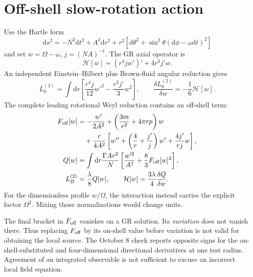 \documentclass[11pt,oneside]{report}
\newcommand{\dd}{\mathrm d}
\begin{document}
\section{Off-shell slow-rotation action}
Use the Hartle form
\begin{equation}
\dd s^2=-N^2\dd t^2+A^2\dd r^2+r^2[\dd\theta^2+\sin^2\theta(\dd\phi-\omega\dd t)^2]
\end{equation}
and set $w=\Omega-\omega$, $j=(NA)^{-1}$. The GR axial operator is
\begin{equation}
\mathcal H[w]=(r^4jw')'+4r^3j'w.
\end{equation}
An independent Einstein--Hilbert plus Brown-fluid angular reduction gives
\begin{equation}
L_0^{(2)}=\int\dd r\left[\frac{r^4j}{12}w'^2-\frac{r^3j'}3w^2\right],\qquad
\frac{\delta L_0^{(2)}}{\delta w}=-\frac16\mathcal H[w].
\end{equation}
The complete leading rotational Weyl reduction contains an off-shell term:
\begin{align}
F_{\rm off}[w]&=-\frac{w'}{2A^2}+
\left(\frac{3m}{r^2}+4\pi rp\right)w\\
&\quad+\frac r{4A^2}\left[w''+\left(\frac4r+\frac{j'}j\right)w'+\frac{4j'}{rj}w\right],\\
Q[w]&=\int\dd r\frac{\Gamma Ar^2}{N}
\left[\frac{w'^2}{A^2}+\frac83F_{\rm off}[w]^2\right],\\
L_B^{(2)}&=\frac\lambda8Q[w],\qquad
\mathcal H[w]=\frac{3\lambda}{4}\frac{\delta Q}{\delta w}.
\end{align}
For the dimensionless profile $w/\Omega$, the interaction instead carries the explicit factor $\Omega^2$. Mixing those normalizations would change units.

The final bracket in $F_{\rm off}$ vanishes on a GR solution. Its \emph{variation} does not vanish there. Thus replacing $F_{\rm off}$ by its on-shell value before variation is not valid for obtaining the local source. The October 8 check reports opposite signs for the on-shell-substituted and four-dimensional directional derivatives at one test radius. Agreement of an integrated observable is not sufficient to excuse an incorrect local field equation.
\end{document}
